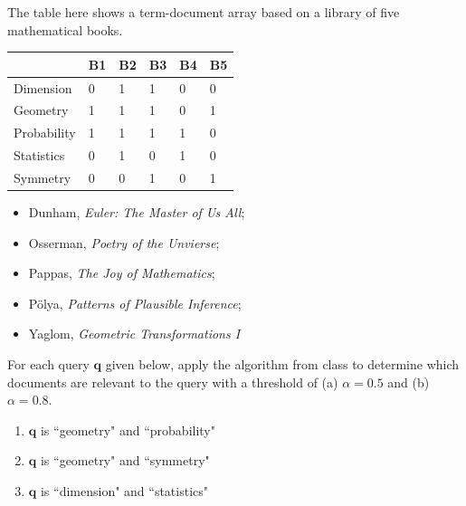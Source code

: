 \documentclass[10pt]{extarticle}
\begin{document}
\begin{problem}
[Problem 2]
The table here shows a term-document array based on a library of five mathematical books.
\begin{minipage}{0.45\textwidth}
\hfill
\begin{tabular}{l | l | l | l | l | l}
& B1 & B2 & B3 & B4 & B5 \\ \hline
Dimension & 0 & 1 & 1 & 0 & 0\\ \hline
Geometry & 1 & 1 & 1 & 0 & 1\\ \hline
Probability & 1 & 1 & 1 & 1 & 0 \\ \hline
Statistics & 0 & 1 & 0 & 1 & 0 \\ \hline
Symmetry & 0 & 0 & 1 & 0 & 1 \\ \hline
\end{tabular}
\end{minipage}
\begin{minipage}{0.5\textwidth}
\begin{itemize}
\item[B1] Dunham, \emph{Euler: The Master of Us All};
\item[B2] Osserman, \emph{Poetry of the Unvierse};
\item[B3] Pappas, \emph{The Joy of Mathematics};
\item[B4] P\"olya, \emph{Patterns of Plausible Inference};
\item[B5] Yaglom, \emph{Geometric Transformations I}
\end{itemize}
\end{minipage}
\medskip

For each query $\mathbf{q}$ given below, apply the algorithm from class to determine which documents are relevant to the query with a threshold of (a) $\alpha=0.5$ and (b) $\alpha=0.8$.
\begin{enumerate}[label=\roman*.]
\item $\mathbf{q}$ is ``geometry" and ``probability"
\item $\mathbf{q}$ is ``geometry" and ``symmetry"
\item $\mathbf{q}$ is ``dimension" and ``statistics"
\end{enumerate}
\end{problem}
\end{document}
